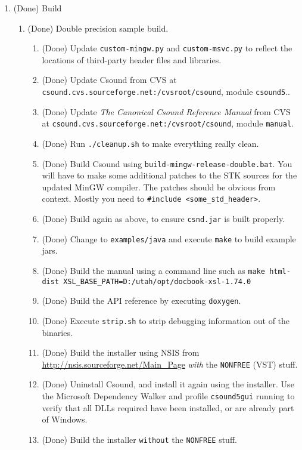 \documentclass[11pt,letterpaper,onecolumn]{scrartcl}
\begin{document}
\begin{sloppypar}
\begin{enumerate}
\begin{enumerate}
 		\end{enumerate}
	\item (Done) Build   
		\begin{enumerate}				
			\item (Done) Double precision sample build.
				\begin{enumerate}
		    	\item (Done) Update \texttt{custom-mingw.py} and \texttt{custom-msvc.py} to reflect the locations of third-party header files and libraries.
					\item (Done) Update Csound from CVS at \verb|csound.cvs.sourceforge.net:/cvsroot/csound|, module \texttt{csound5}..
					\item (Done) Update \emph{The Canonical Csound Reference Manual} from CVS at \verb|csound.cvs.sourceforge.net:/cvsroot/csound|, module \texttt{manual}.
					\item (Done) Run \texttt{./cleanup.sh} to make everything really clean.
			    \item (Done) Build Csound using \texttt{build-mingw-release-double.bat}. You will have to make some additional patches to the STK sources for the updated MinGW compiler. The patches should be obvious from context. Mostly you need to \verb|#include <some_std_header>|.
			    \item (Done) Build again as above, to ensure \texttt{csnd.jar} is built properly.
			    \item (Done) Change to \texttt{examples/java} and execute \texttt{make} to build example jars.
			    \item (Done) Build the manual using a command line such as \verb|make html-dist XSL_BASE_PATH=D:/utah/opt/docbook-xsl-1.74.0|
			    \item (Done) Build the API reference by executing \texttt{doxygen}.
			    \item (Done) Execute \texttt{strip.sh} to strip debugging information out of the binaries.
			    \item (Done) Build the installer using NSIS from \url{http://nsis.sourceforge.net/Main_Page} \emph{with} the \verb|NONFREE| (VST) stuff.  
			    \item (Done) Uninstall Csound, and install it again using the installer. Use the Microsoft Dependency Walker and profile \texttt{csound5gui} running to verify that all DLLs required have been installed, or are already part of Windows.
			    \item (Done) Build the installer \texttt{without} the \verb|NONFREE| stuff.   

\end{enumerate}
\end{enumerate}
\end{enumerate}
\end{sloppypar}
\end{document}
